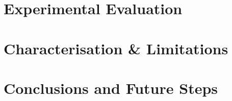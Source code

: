 \documentclass[letterpaper, 10 pt, conference]{ieeeconf}
\begin{document}
\section{Experimental Evaluation}
  \label{section:results}
  

\section{Characterisation \& Limitations}
  \label{section:characterisation}
  

\section{Conclusions and Future Steps}
  \label{section:finale}
  





\balance
\end{document}
